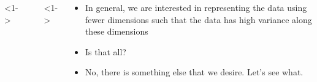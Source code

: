 \begin{frame}
  \begin{columns}
    <1->
    \begin{overlayarea}{\textwidth}{\textheight}
      \makebox[\textwidth][c]{\usebox{\pcacolorcontent}}
    \end{overlayarea}

    <1->
    \begin{overlayarea}{\textwidth}{\textheight}
      \begin{itemize}\justifying
        \item<1-> In general, we are interested in representing the data using fewer dimensions such that  {the data has high variance along these dimensions}
        \item<3-> Is that all?
        \item<4-> No, there is something else that we desire. Let's see what.
      \end{itemize}
    \end{overlayarea}
  \end{columns}
\end{frame}


